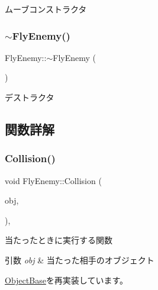 ムーブコンストラクタ 

\mbox{\label{class_fly_enemy_ae4345f89a659b559c08d0bb879db7158}} 
\subsubsection{\texorpdfstring{$\sim$\+Fly\+Enemy()}{~FlyEnemy()}}
{\footnotesize\ttfamily Fly\+Enemy\+::$\sim$\+Fly\+Enemy (\begin{DoxyParamCaption}{ }\end{DoxyParamCaption})\hspace{0.3cm}{\ttfamily [inline]}}



デストラクタ 



\subsection{関数詳解}
\mbox{\label{class_fly_enemy_a90b7b82f93094aaee9069daafe319a2b}} 
\subsubsection{\texorpdfstring{Collision()}{Collision()}}
{\footnotesize\ttfamily void Fly\+Enemy\+::\+Collision (\begin{DoxyParamCaption}\item[{\mbox{\hyperlink{class_object_base}{Object\+Base}} $\ast$}]{obj,  }\item[{\mbox{\hyperlink{common_8h_ae148fff5818e9444b4ab2288829559bf}{Vec2}}}]{ }\end{DoxyParamCaption})\hspace{0.3cm}{\ttfamily [final]}, {\ttfamily [virtual]}}



当たったときに実行する関数 


\begin{DoxyParams}{引数}
{\em obj} & 当たった相手のオブジェクト \\
\hline
\end{DoxyParams}


\mbox{\hyperlink{class_object_base_a3e1db79dfa119be067d816c22d09839d}{Object\+Base}}を再実装しています。

